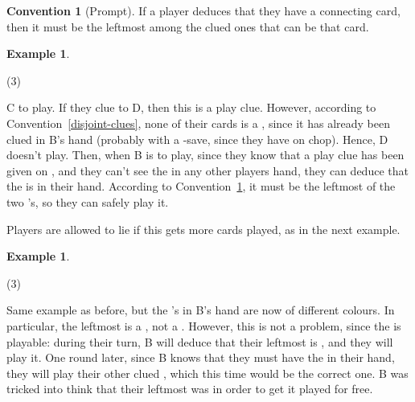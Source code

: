 \documentclass[a4paper]{article}
\theoremstyle{plain}
\theoremstyle{definition}
\newtheorem{example}[theorem]{Example}
\newtheorem{convention}[theorem]{Convention}
\begin{document}
\begin{convention}[Prompt]
	\label{prompt}
	If a player deduces that they have a connecting card, then it must be the leftmost among the clued ones that can be that card.
\end{convention}

\begin{example}
	\hfill
	\begin{tasks}(3)
		\task[+]      
		\task[A]    
		\task[B]    
		\task[C]    
		\task[D]    
		\task[E]    
	\end{tasks}
	
	C to play. If they clue  to D, then this is a play clue. However, according to Convention~\ref{disjoint-clues}, none of their cards is a , since it has already been clued in B's hand (probably with a -save, since they have  on chop). Hence, D doesn't play. Then, when B is to play, since they know that a play clue has been given on , and they can't see the  in any other players hand, they can deduce that the  is in their hand. According to Convention~\ref{prompt}, it must be the leftmost of the two 's, so they can safely play it.
\end{example}

Players are allowed to lie if this gets more cards played, as in the next example.

\begin{example}
	\hfill
	\begin{tasks}(3)
		\task[+]      
		\task[A]    
		\task[B]    
		\task[C]    
		\task[D]    
		\task[E]    
	\end{tasks}
	
	Same example as before, but the 's in B's hand are now of different colours. In particular, the leftmost is a , not a . However, this is not a problem, since the  is playable: during their turn, B will deduce that their leftmost  is , and they will play it. One round later, since B knows that they must have the  in their hand, they will play their other clued , which this time would be the correct one. B was tricked into think that their leftmost  was  in order to get it played for free.
\end{example}
\end{document}
